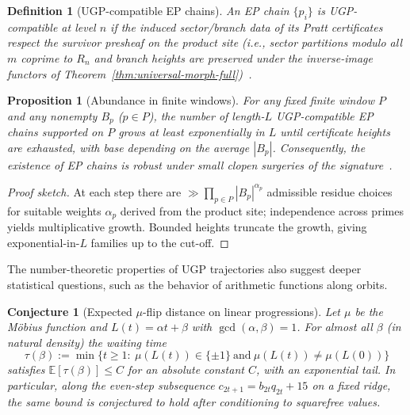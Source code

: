 \documentclass[12pt]{article}
\newtheorem{proposition}[theorem]{Proposition}
\newtheorem{definition}[theorem]{Definition}
\newtheorem{conjecture}[theorem]{Conjecture}
\numberwithin{equation}{section}
\begin{document}
\begin{definition}[UGP-compatible EP chains]\label{def:EP-UGP}
An EP chain $\{p_i\}$ is \emph{UGP-compatible} at level $n$ if the induced sector/branch data of its Pratt certificates respect the survivor presheaf on the product site (i.e., sector partitions modulo all $m$ coprime to $R_n$ and branch heights are preserved under the inverse-image functors of Theorem~\ref{thm:universal-morph-full})~\cite{SpivackUGPFormalization,ugp-lean}.
\end{definition}

\begin{proposition}[Abundance in finite windows]\label{prop:EP-window}
For any fixed finite window $P$ and any nonempty $B_p$ ($p\in P$), the number of length-$L$ UGP-compatible EP chains supported on $P$ grows at least exponentially in $L$ until certificate heights are exhausted, with base depending on the average $|B_p|$. Consequently, the existence of EP chains is robust under small clopen surgeries of the signature~\cite{SpivackUGPFormalization,ugp-lean}.
\end{proposition}

\begin{proof}[Proof sketch]
At each step there are $\gg \prod_{p\in P} |B_p|^{\alpha_p}$ admissible residue choices for suitable weights $\alpha_p$ derived from the product site; independence across primes yields multiplicative growth. Bounded heights truncate the growth, giving exponential-in-$L$ families up to the cut-off.
\end{proof}

The number-theoretic properties of UGP trajectories also suggest deeper statistical questions, such as the behavior of arithmetic functions along orbits.

\begin{conjecture}[Expected $\mu$-flip distance on linear progressions]\label{conj:mu-flip}
Let $\mu$ be the Möbius function and $L(t)=\alpha t+\beta$ with $\gcd(\alpha,\beta)=1$. For almost all $\beta$ (in natural density) the waiting time
\[
\tau(\beta):=\min\{t\ge 1:\ \mu(L(t))\in\{\pm1\}\ \text{and}\ \mu(L(t))\ne \mu(L(0))\}
\]
satisfies $\mathbb{E}[\tau(\beta)]\le C$ for an absolute constant $C$, with an exponential tail. In particular, along the even-step subsequence $c_{2t+1}=b_{2t}q_{2t}+15$ on a fixed ridge, the same bound is conjectured to hold after conditioning to squarefree values.
\end{conjecture}

\end{document}
